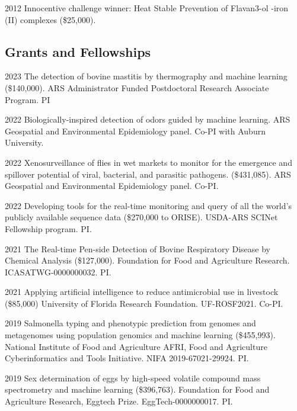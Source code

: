 \documentclass[12pt,letterpaper]{report}
\begin{document}
    \begin{tablist}

    	\item[2012] \tab Innocentive challenge winner: Heat Stable Prevention of  Flavan3-ol -iron (II) complexes (\$25,000).

    \end{tablist}

    \subsection*{Grants and Fellowships}

    \begin{tablist}
    	\item[2023]\tab The detection of bovine mastitis by thermography and machine learning (\$140,000). ARS Administrator Funded Postdoctoral Research Associate Program. PI
    	\item[2022]\tab Biologically-inspired detection of odors guided by machine learning. ARS Geospatial and Environmental Epidemiology panel. Co-PI with Auburn University.
    	\item[2022] \tab Xenosurveillance of flies in wet markets to monitor for the emergence and spillover potential of viral, bacterial, and parasitic pathogens. (\$431,085). ARS Geospatial and Environmental Epidemiology panel. Co-PI.
	\item[2022] \tab Developing tools for the real-time monitoring and query of all the world's publicly available sequence data (\$270,000 to ORISE). USDA-ARS SCINet Fellowship program. PI.
	\item[2021] \tab The Real-time Pen-side Detection of Bovine Respiratory Disease by Chemical Analysis (\$127,000). Foundation for Food and Agriculture Research.  ICASATWG-0000000032. PI.
	\item[2021] \tab Applying artificial intelligence to reduce antimicrobial use in livestock (\$85,000) University of Florida Research Foundation.  UF-ROSF2021. Co-PI.
        \item[2019] \tab  Salmonella typing and phenotypic prediction from genomes and metagenomes using population genomics and machine learning (\$455,993). National Institute of Food and Agriculture AFRI, Food and Agriculture Cyberinformatics and Tools 		Initiative. NIFA 2019-67021-29924.  PI.
        \item[2019]\tab  Sex determination of eggs by high-speed volatile compound mass spectrometry and machine learning  (\$396,763).  Foundation for Food and Agriculture Research, Eggtech Prize.  EggTech-0000000017. PI.

\end{tablist}
\end{document}
